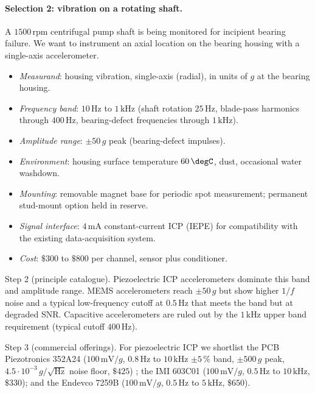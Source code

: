 \paragraph{Selection 2: vibration on a rotating shaft.}
A $1500 \,\text{rpm}$ centrifugal pump shaft is being monitored for
incipient bearing failure. We want to instrument an axial location
on the bearing housing with a single-axis accelerometer.

\begin{itemize}[leftmargin=*]
  \item \emph{Measurand}: housing vibration, single-axis (radial), in
    units of $g$ at the bearing housing.
  \item \emph{Frequency band}: $10 \,\si{\hertz}$ to $1 \,\si{\kilo
    \hertz}$ (shaft rotation $25 \,\si{\hertz}$, blade-pass
    harmonics through $400 \,\si{\hertz}$, bearing-defect
    frequencies through $1 \,\si{\kilo\hertz}$).
  \item \emph{Amplitude range}: $\pm 50 \,g$ peak (bearing-defect
    impulses).
  \item \emph{Environment}: housing surface temperature $60 \,\degC$,
    dust, occasional water washdown.
  \item \emph{Mounting}: removable magnet base for periodic spot
    measurement; permanent stud-mount option held in reserve.
  \item \emph{Signal interface}: $4 \,\si{\milli\ampere}$
    constant-current ICP (IEPE) for compatibility with the existing
    data-acquisition system.
  \item \emph{Cost}: $\$300$ to $\$800$ per channel, sensor plus
    conditioner.
\end{itemize}

Step 2 (principle catalogue). Piezoelectric ICP accelerometers
dominate this band and amplitude range. MEMS accelerometers reach
$\pm 50 \,g$ but show higher $1/f$ noise and a typical low-frequency
cutoff at $0.5 \,\si{\hertz}$ that meets the band but at degraded
SNR. Capacitive accelerometers are ruled out by the $1 \,\si{\kilo
\hertz}$ upper band requirement (typical cutoff $400 \,\si{\hertz}$).

Step 3 (commercial offerings). For piezoelectric ICP we shortlist
the PCB Piezotronics 352A24 ($100 \,\si{\milli\volt}/g$, $0.8 \,\si
{\hertz}$ to $10 \,\si{\kilo\hertz}$ $\pm 5\,\%$ band, $\pm 500 \,g$
peak, $4.5 \cdot 10^{-3} \,g/\sqrt{\si{\hertz}}$ noise floor,
$\$425$) \cite{text:ch05t3-pcb-352a24-datasheet}; the IMI 603C01
($100 \,\si{\milli\volt}/g$, $0.5 \,\si{\hertz}$ to $10 \,\si{\kilo
\hertz}$, $\$330$); and the Endevco 7259B
($100 \,\si{\milli\volt}/g$, $0.5 \,\si{\hertz}$ to $5 \,\si{\kilo
\hertz}$, $\$650$).

